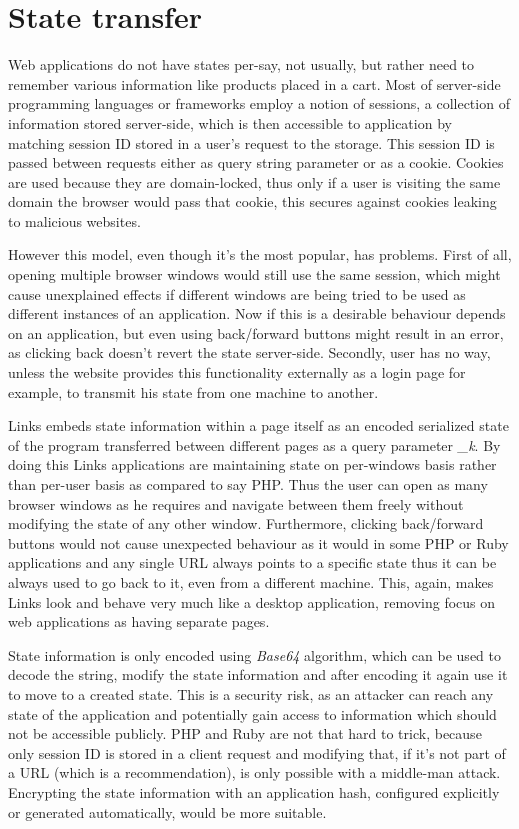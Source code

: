 \section{State transfer}

Web applications do not have states per-say, not usually, but rather need to remember various information like products placed in a cart. Most of server-side programming languages or frameworks employ a notion of sessions, a collection of information stored server-side, which is then accessible to application by matching session ID stored in a user's request to the storage. This session ID is passed between requests either as query string parameter or as a cookie. Cookies are used because they are domain-locked, thus only if a user is visiting the same domain the browser would pass that cookie, this secures against cookies leaking to malicious websites. 

However this model, even though it's the most popular, has problems. First of all, opening multiple browser windows would still use the same session, which might cause unexplained effects if different windows are being tried to be used as different instances of an application. Now if this is a desirable behaviour depends on an application, but even using back/forward buttons might result in an error, as clicking back doesn't revert the state server-side. Secondly, user has no way, unless the website provides this functionality externally as a login page for example, to transmit his state from one machine to another.

Links embeds state information within a page itself as an encoded serialized state of the program transferred between different pages as a query parameter \textit{\_k}. By doing this Links applications are maintaining state on per-windows basis rather than per-user basis as compared to say PHP. Thus the user can open as many browser windows as he requires and navigate between them freely without modifying the state of any other window. Furthermore, clicking back/forward buttons would not cause unexpected behaviour as it would in some PHP or Ruby applications and any single URL always points to a specific state thus it can be always used to go back to it, even from a different machine. This, again, makes Links look and behave very much like a desktop application, removing focus on web applications as having separate pages.

State information is only encoded using \textit{Base64} algorithm, which can be used to decode the string, modify the state information and after encoding it again use it to move to a created state. This is a security risk, as an attacker can reach any state of the application and potentially gain access to information which should not be accessible publicly. PHP and Ruby are not that hard to trick, because only session ID is stored in a client request and modifying that, if it's not part of a URL (which is a recommendation), is only possible with a middle-man attack. Encrypting the state information with an application hash, configured explicitly or generated automatically, would be more suitable.

